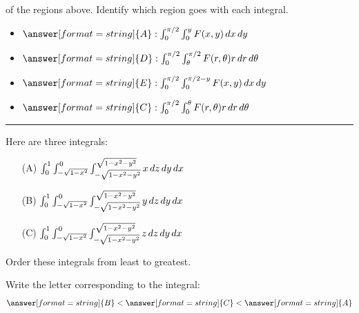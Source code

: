 \documentclass{ximera}
\begin{document}
\begin{problem}
  of the regions above. Identify which region goes with each integral.
  \begin{itemize}
    \item[] $\answer[format=string]{A}: \int_0^{\pi/2} \int_{0}^{y}F(x,y) \d x\d y$
    \item[] $\answer[format=string]{D}: \int_0^{\pi/2} \int_{\theta}^{\pi/2}F(r,\theta)r \d r\d\theta$
    \item[] $\answer[format=string]{E}: \int_0^{\pi/2} \int_{0}^{\pi/2-y}F(x,y) \d x\d y$
    \item[] $\answer[format=string]{C}: \int_0^{\pi/2} \int_0^{\theta}F(r,\theta)r \d r\d \theta$
    \pdfOnly{\end{multicols}}
  \end{itemize}
\end{problem}

\hrule



\begin{problem}
  Here are three integrals:
  \begin{enumerate}
  \item[(A)] $\int_0^1 \int_{-\sqrt{1-x^2}}^0\int_{-\sqrt{1-x^2-y^2}}^{\sqrt{1-x^2-y^2}} x \mathop{}\!d z \mathop{}\!d y \mathop{}\!d x$
  \item[(B)] $\int_0^1 \int_{-\sqrt{1-x^2}}^0\int_{-\sqrt{1-x^2-y^2}}^{\sqrt{1-x^2-y^2}} y \mathop{}\!d z \mathop{}\!d y \mathop{}\!d x$
  \item[(C)] $\int_0^1 \int_{-\sqrt{1-x^2}}^0\int_{-\sqrt{1-x^2-y^2}}^{\sqrt{1-x^2-y^2}} z \mathop{}\!d z \mathop{}\!d y \mathop{}\!d x$ 
  \end{enumerate}
  \pdfOnly{\columnbreak}
  Order these integrals from least to greatest.
  \pdfOnly{\end{multicols}}
  \begin{prompt}
    Write the letter corresponding to the integral:
    \[
    \answer[format=string]{B} < \answer[format=string]{C} < \answer[format=string]{A}
    \]
  \end{prompt}
  \end{problem}
\end{document}
